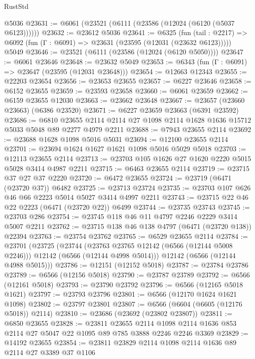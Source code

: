 \begin{lexlean}{RustStd}
\begin{coremodule}
    @5036
@23631 := @6061 (@23521 (@6111 (@23586 (@12024 (@6120 (@5037 @6123))))))
@23632 := @23612 @5036
@23641 := @6325
    (fun (tail : @2217) => @6092 (fun (Γ : @6091) => @23631 (@23595 (@12031 (@23632 @6123)))))
    @5049
@23646 := @23521 (@6111 (@23586 (@12024 (@6120 @5050))))
@23647 := @6061 @23646
@23648 := @23632 @5049
@23653 := @6343 (fun (Γ : @6091) => @23647 (@23595 (@12031 @23648)))
@23654 := @12663 @12343
@23655 := @22203 @23654
@23656 := @23653 @23655
@23657 := @6227 @23646
@23658 := @6152 @23655
@23659 := @23593 @23658
@23660 := @6061 @23659
@23662 := @6159 @23655 @12030
@23663 := @23662 @23648
@23667 := @23657 (@23660 @23663) (@6386 @23520)
@23671 := @6227 @23659 @23663 (@6391 @23592)
@23686 := @6810
    @23655
    @2114
    @2114
    @27
    @1098
    @2114
    @1628
    @1636
    @15712
    @5033
    @5048
    @89
    @2277
    @4979
    @2211
@23688 := @7943 @23655 @2114
@23692 := @23688 @1628 @1098 @5016 @5031
@23694 := @12100 @23655 @2114
@23701 := @23694 @1624 @1627 @1621 @1098 @5016 @5029 @5018
@23703 := @12113 @23655 @2114
@23713 := @23703 @105 @1626 @27 @1620 @2220 @5015 @5028 @3414 @4987 @2211
@23715 := @6463 @23655 @2114
@23719 := @23715 @37 @27 @37 @2220
@23720 := @6472 @23655
@23724 := @23719 (@6471 (@23720 @37)) @6482
@23725 := @23713 @23724
@23735 := @23703 @107 @626 @46 @66 @2223 @5014 @5027 @3414 @4997 @2211
@23743 := @23715 @22 @46 @22 @2223 (@6471 (@23720 @22)) @6499
@23744 := @23735 @23743
@23745 := @23703 @286
@23754 := @23745 @118 @46 @11 @4797 @2246 @2229 @3414 @5007 @2211
@23762 := @23715 @138 @46 @138 @4797 (@6471 (@23720 @138)) @22394
@23763 := @23754 @23762
@23765 := @6529 @23655 @2114
@23784 := @23701
    (@23725
      (@23744
        (@23763 @23765 @12142 (@6566 (@12144 @5008 @2246)))
        @12142
        (@6566 (@12144 @4998 @5014)))
      @12142
      (@6566 (@12144 @4988 @5015)))
@23786 := @12151 (@12152 @5018)
@23787 := @23784 @23786
@23789 := @6566 (@12156 @5018)
@23790 := @23787 @23789
@23792 := @6566 (@12161 @5018)
@23793 := @23790 @23792
@23796 := @6566 (@12165 @5018 @1621)
@23797 := @23793 @23796
@23801 := @6566 (@12170 @1624 @1621 @1098)
@23802 := @23797 @23801
@23807 := @6566 (@6604 (@6605 (@12176 @5018)) @2114)
@23810 := @23686 (@23692 (@23802 @23807))
@23811 := @6850 @23655
@23828 := @23811
    @23655
    @2114
    @1098
    @2114
    @1636
    @853
    @2114
    @27
    @5047
    @22
    @1095
    @89
    @785
    @3888
    @2246
    @2246
    @3369
@23829 := @14192 @23655
@23854 := @23811
    @23829
    @2114
    @1098
    @2114
    @1636
    @89
    @2114
    @27
    @3389
    @37
    @1106

\end{coremodule}
\end{lexlean}
